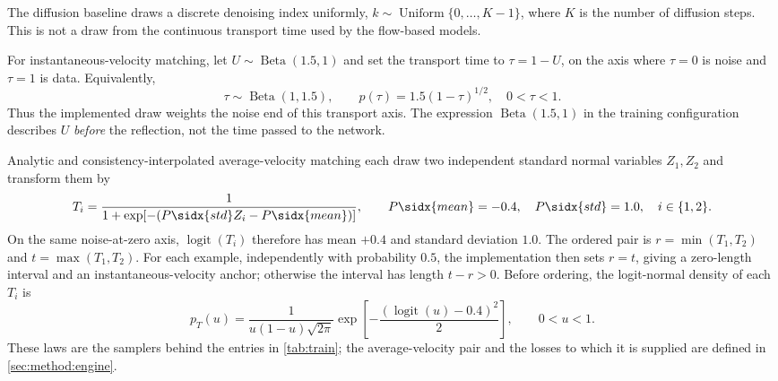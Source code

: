 The diffusion baseline draws a discrete denoising index uniformly,
$k\sim\operatorname{Uniform}\{0,\ldots,K-1\}$, where $K$ is the number of diffusion steps. This is not
a draw from the continuous transport time used by the flow-based models.

For instantaneous-velocity matching, let $U\sim\operatorname{Beta}(1.5,1)$ and set the transport
time to $\tau=1-U$, on the axis where $\tau=0$ is noise and $\tau=1$ is data. Equivalently,
\begin{equation}
  \tau\sim\operatorname{Beta}(1,1.5),\qquad
  p(\tau)=1.5(1-\tau)^{1/2},\quad 0<\tau<1.
\end{equation}
Thus the implemented draw weights the noise end of this transport axis. The expression
$\operatorname{Beta}(1.5,1)$ in the training configuration describes $U$ \emph{before} the reflection,
not the time passed to the network.

Analytic and consistency-interpolated average-velocity matching each draw two independent standard
normal variables $Z_1,Z_2$ and transform them by
\begin{equation}
  T_i=\frac{1}{1+\exp[-(P\sidx{std}Z_i-P\sidx{mean})]},\qquad
  P\sidx{mean}=-0.4,\quad P\sidx{std}=1.0,\quad i\in\{1,2\}.
\end{equation}
On the same noise-at-zero axis, $\operatorname{logit}(T_i)$ therefore has mean $+0.4$ and standard
deviation $1.0$. The ordered pair is $r=\min(T_1,T_2)$ and $t=\max(T_1,T_2)$. For each example,
independently with probability $0.5$, the implementation then sets $r=t$, giving a zero-length interval and an
instantaneous-velocity anchor; otherwise the interval has length $t-r>0$. Before ordering, the
logit-normal density of each $T_i$ is
\begin{equation}
  p_T(u)=\frac{1}{u(1-u)\sqrt{2\pi}}
  \exp\!\left[-\frac{(\operatorname{logit}(u)-0.4)^2}{2}\right],\qquad 0<u<1.
\end{equation}
These laws are the samplers behind the entries in \autoref{tab:train}; the average-velocity pair and
the losses to which it is supplied are defined in \autoref{sec:method:engine}.

